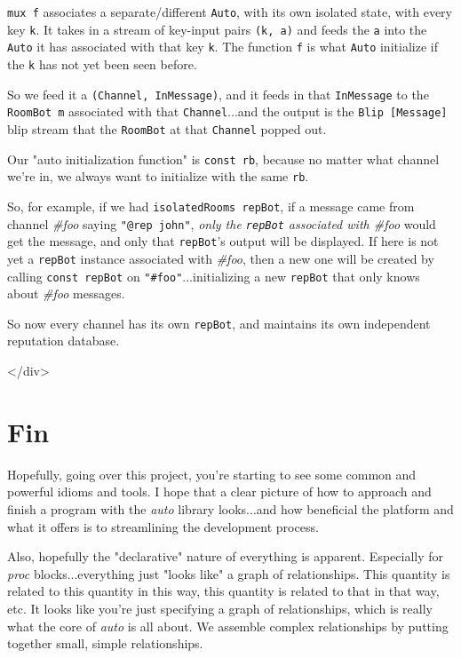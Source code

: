 \documentclass[]{article}
\begin{document}
\texttt{mux\ f} associates a separate/different \texttt{Auto}, with its own
isolated state, with every key \texttt{k}. It takes in a stream of key-input
pairs \texttt{(k,\ a)} and feeds the \texttt{a} into the \texttt{Auto} it has
associated with that key \texttt{k}. The function \texttt{f} is what
\texttt{Auto} initialize if the \texttt{k} has not yet been seen before.

So we feed it a \texttt{(Channel,\ InMessage)}, and it feeds in that
\texttt{InMessage} to the \texttt{RoomBot\ m} associated with that
\texttt{Channel}...and the output is the \texttt{Blip\ {[}Message{]}} blip
stream that the \texttt{RoomBot} at that \texttt{Channel} popped out.

Our "auto initialization function" is \texttt{const\ rb}, because no matter what
channel we're in, we always want to initialize with the same \texttt{rb}.

So, for example, if we had \texttt{isolatedRooms\ repBot}, if a message came
from channel \emph{\#foo} saying \texttt{"@rep\ john"}, \emph{only the
\texttt{repBot} associated with \#foo} would get the message, and only that
\texttt{repBot}'s output will be displayed. If here is not yet a \texttt{repBot}
instance associated with \emph{\#foo}, then a new one will be created by calling
\texttt{const\ repBot} on \texttt{"\#foo"}...initializing a new \texttt{repBot}
that only knows about \emph{\#foo} messages.

So now every channel has its own \texttt{repBot}, and maintains its own
independent reputation database.

\textless{}/div\textgreater{}

\section{Fin}

Hopefully, going over this project, you're starting to see some common and
powerful idioms and tools. I hope that a clear picture of how to approach and
finish a program with the \emph{auto} library looks...and how beneficial the
platform and what it offers is to streamlining the development process.

Also, hopefully the "declarative" nature of everything is apparent. Especially
for \emph{proc} blocks...everything just "looks like" a graph of relationships.
This quantity is related to this quantity in this way, this quantity is related
to that in that way, etc. It looks like you're just specifying a graph of
relationships, which is really what the core of \emph{auto} is all about. We
assemble complex relationships by putting together small, simple relationships.
\end{document}
